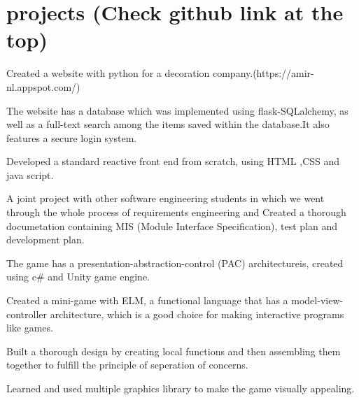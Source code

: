 \documentclass[]{farzad-resume}
\begin{document}
\begin{minipage}[t]{0.66\textwidth}
\section {projects \fontsize{9}{10.8} \selectfont (Check github link at the top)}

\vspace{\topsep}
\begin{tightemize}
    \item {\fontsize{10.5}{12.6} \selectfont Created a website with python for a decoration company.(https://amir-nl.appspot.com/)
    \item The website has a database which was implemented using flask-SQLalchemy, as well as a full-text search among the items saved within the database.It also features a secure login system.
    \item Developed a standard reactive front end from scratch, using HTML ,CSS and java script.}
\end{tightemize}
\sectionsep

\vspace{\topsep}
\begin{tightemize}
    \item {\fontsize{10.5}{12.6} \selectfont A joint project with other software engineering students in which we went through the whole process of requirements engineering and Created a thorough documetation containing MIS (Module Interface Specification), test plan and development plan.
	\item The game has a presentation-abstraction-control (PAC) architectureis, created using c\# and Unity game engine.}
\end{tightemize}
\sectionsep

\vspace{\topsep}
\begin{tightemize}
    \item {\fontsize{10.5}{12.6} \selectfont Created a mini-game with ELM, a functional language that has a model-view-controller architecture, which is a good choice for making interactive programs like games. 
    \item Built a thorough design by creating local functions and then assembling them together to fulfill the principle of seperation of concerns.
     \item Learned and used multiple graphics library to make the game visually appealing.}


\end{tightemize}
\end{minipage}
\end{document}
